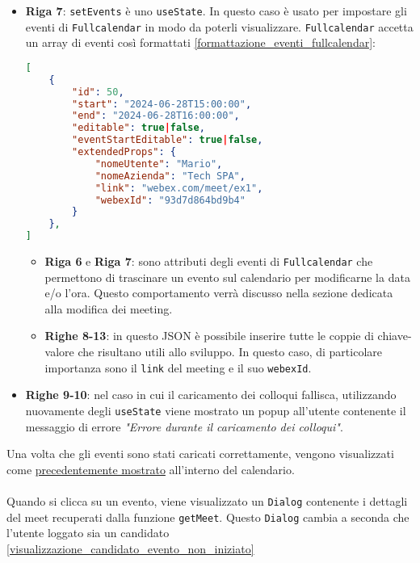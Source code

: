 \begin{itemize}
    \item \textbf{Riga 7}: \texttt{setEvents} è uno \texttt{useState}.  In questo caso è usato per impostare gli eventi 
    di \texttt{Fullcalendar} in modo da poterli visualizzare. \texttt{Fullcalendar} accetta un array di eventi così formattati \ref{formattazione_eventi_fullcalendar}:
\begin{lstlisting}[language=json, label={formattazione_eventi_fullcalendar}, caption={formattazione eventi FullCalendar}]
[
    {
        "id": 50,
        "start": "2024-06-28T15:00:00",
        "end": "2024-06-28T16:00:00",
        "editable": true|false,
        "eventStartEditable": true|false,
        "extendedProps": {
            "nomeUtente": "Mario",
            "nomeAzienda": "Tech SPA",
            "link": "webex.com/meet/ex1",
            "webexId": "93d7d864bd9b4"
        }
    },                   
]               
\end{lstlisting}
    \begin{itemize}
        \item \textbf{Riga 6} e \textbf{Riga 7}: sono attributi degli eventi di \texttt{Fullcalendar}
        che permettono di trascinare un evento sul calendario per modificarne la data e/o l'ora. Questo comportamento verrà
        discusso nella sezione dedicata alla modifica dei meeting.
        \item \textbf{Righe 8-13}: in questo JSON è possibile inserire tutte le coppie di chiave-valore che risultano
        utili allo sviluppo. In questo caso, di particolare importanza sono il \texttt{link} del meeting e il suo \texttt{webexId}.
    \end{itemize}

    \item \textbf{Righe 9-10}: nel caso in cui il caricamento dei colloqui fallisca,
    utilizzando nuovamente degli \texttt{useState} viene mostrato un popup all'utente 
    contenente il messaggio di errore \textit{"Errore durante il caricamento dei colloqui"}.
\end{itemize}
Una volta che gli eventi sono stati caricati correttamente, vengono visualizzati come 
\hyperref[fig:visualizzazioneCalendario]{precedentemente mostrato} all'interno del calendario.
\\
\\
Quando si clicca su un evento, viene visualizzato un \texttt{Dialog} contenente i dettagli 
del meet recuperati dalla funzione \texttt{getMeet}.
Questo \texttt{Dialog} cambia a seconda che l'utente loggato sia un candidato \ref{visualizzazione_candidato_evento_non_iniziato} 
